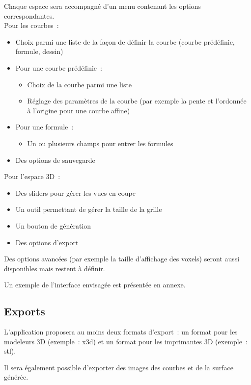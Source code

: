 \documentclass{scrartcl}
\begin{document}
		Chaque espace sera accompagné d'un menu contenant les options correspondantes.\\
		Pour les courbes~:			
		\begin{itemize}
			\item Choix parmi une liste de la façon de définir la courbe (courbe prédéfinie, formule, dessin)
			\item Pour une courbe prédéfinie~:
			\begin{itemize}[label={*}]
				\item Choix de la courbe parmi une liste
				\item Réglage des paramètres de la courbe (par exemple la pente et l'ordonnée à l'origine pour une courbe affine)
			\end{itemize}
			\item Pour une formule~:
			\begin{itemize}[label={*}]
				\item Un ou plusieurs champs pour entrer les formules
			\end{itemize}
			\item Des options de sauvegarde
		\end{itemize}
		
		Pour l'espace 3D~:
		
		\begin{itemize}
			\item Des sliders pour gérer les vues en coupe
			\item Un outil permettant de gérer la taille de la grille
			\item Un bouton de génération
			\item Des options d'export
		\end{itemize}
		
		Des options avancées (par exemple la taille d'affichage des voxels) seront aussi disponibles mais restent à définir.
		
		Un exemple de l'interface envisagée est présentée en annexe.


	\subsection{Exports}
		L'application proposera au moins deux formats d'export~: un format pour les modeleurs 3D (exemple~: x3d) et un format pour les imprimantes 3D (exemple~: stl).
		
		Il sera également possible d'exporter des images des courbes et de la surface générée.
\end{document}
